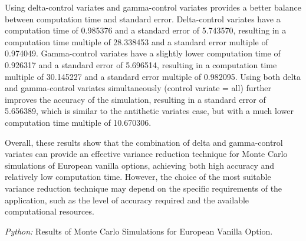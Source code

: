 \documentclass[11pt, a4paper, leqno]{article}
\begin{document}
Using delta-control variates and gamma-control variates provides a better balance between computation time and standard error. Delta-control variates have a computation time of 0.985376 and a standard error of 5.743570, resulting in a computation time multiple of 28.338453 and a standard error multiple of 0.974049. Gamma-control variates have a slightly lower computation time of 0.926317 and a standard error of 5.696514, resulting in a computation time multiple of 30.145227 and a standard error multiple of 0.982095. Using both delta and gamma-control variates simultaneously (control variate = all) further improves the accuracy of the simulation, resulting in a standard error of 5.656389, which is similar to the antithetic variates case, but with a much lower computation time multiple of 10.670306.

Overall, these results show that the combination of delta and gamma-control variates can provide an effective variance reduction technique for Monte Carlo simulations of European vanilla options, achieving both high accuracy and relatively low computation time. However, the choice of the most suitable variance reduction technique may depend on the specific requirements of the application, such as the level of accuracy required and the available computational resources.

\begin{center}
\begin{table}[hbt!]
    
    \caption{\label{tab:results}\emph{Python:} Results of Monte Carlo Simulations for European Vanilla Option.}
\end{table}
\end{center}





\printbibliography
{}



\end{document}
